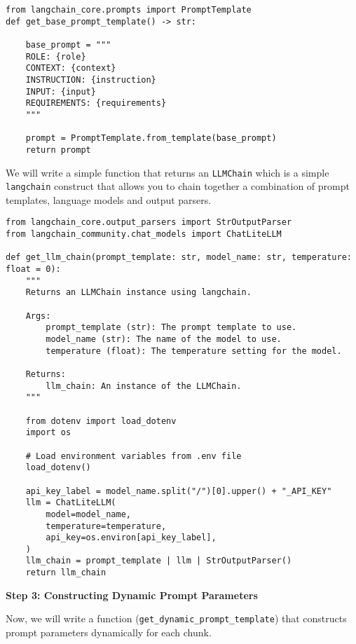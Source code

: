 \begin{verbatim}
from langchain_core.prompts import PromptTemplate
def get_base_prompt_template() -> str:
    
    base_prompt = """
    ROLE: {role}
    CONTEXT: {context}
    INSTRUCTION: {instruction}
    INPUT: {input}
    REQUIREMENTS: {requirements}
    """
    
    prompt = PromptTemplate.from_template(base_prompt)
    return prompt
\end{verbatim}

We will write a simple function that returns an \texttt{LLMChain} which is a simple \texttt{langchain} construct that allows you to chain together a combination of prompt templates, language models and output parsers.

\begin{verbatim}
from langchain_core.output_parsers import StrOutputParser
from langchain_community.chat_models import ChatLiteLLM

def get_llm_chain(prompt_template: str, model_name: str, temperature: float = 0):
    """
    Returns an LLMChain instance using langchain.

    Args:
        prompt_template (str): The prompt template to use.
        model_name (str): The name of the model to use.
        temperature (float): The temperature setting for the model.

    Returns:
        llm_chain: An instance of the LLMChain.
    """
    
    from dotenv import load_dotenv
    import os

    # Load environment variables from .env file
    load_dotenv()
    
    api_key_label = model_name.split("/")[0].upper() + "_API_KEY"
    llm = ChatLiteLLM(
        model=model_name,
        temperature=temperature,
        api_key=os.environ[api_key_label],
    )
    llm_chain = prompt_template | llm | StrOutputParser()
    return llm_chain
\end{verbatim}

\textbf{Step 3: Constructing Dynamic Prompt Parameters}

Now, we will write a function (\texttt{get\_dynamic\_prompt\_template}) that constructs prompt parameters dynamically for each chunk.

